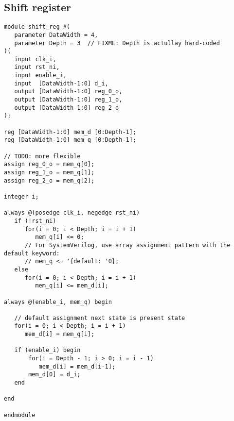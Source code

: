 \subsection{Shift register}

\begin{verbatim}
module shift_reg #(
   parameter DataWidth = 4,
   parameter Depth = 3  // FIXME: Depth is actullay hard-coded
)(
   input clk_i,
   input rst_ni,
   input enable_i,
   input  [DataWidth-1:0] d_i,
   output [DataWidth-1:0] reg_0_o,
   output [DataWidth-1:0] reg_1_o,
   output [DataWidth-1:0] reg_2_o
);

reg [DataWidth-1:0] mem_d [0:Depth-1];
reg [DataWidth-1:0] mem_q [0:Depth-1];

// TODO: more flexible
assign reg_0_o = mem_q[0];
assign reg_1_o = mem_q[1];
assign reg_2_o = mem_q[2];

integer i;

always @(posedge clk_i, negedge rst_ni)
   if (!rst_ni)
      for(i = 0; i < Depth; i = i + 1)
         mem_q[i] <= 0;
      // For SystemVerilog, use array assignment pattern with the default keyword:
      // mem_q <= '{default: '0};
   else
      for(i = 0; i < Depth; i = i + 1)
         mem_q[i] <= mem_d[i];

always @(enable_i, mem_q) begin

   // default assignment next state is present state
   for(i = 0; i < Depth; i = i + 1)
      mem_d[i] = mem_q[i];

   if (enable_i) begin
       for(i = Depth - 1; i > 0; i = i - 1)
          mem_d[i] = mem_d[i-1];
       mem_d[0] = d_i;
   end

end

endmodule
\end{verbatim}

